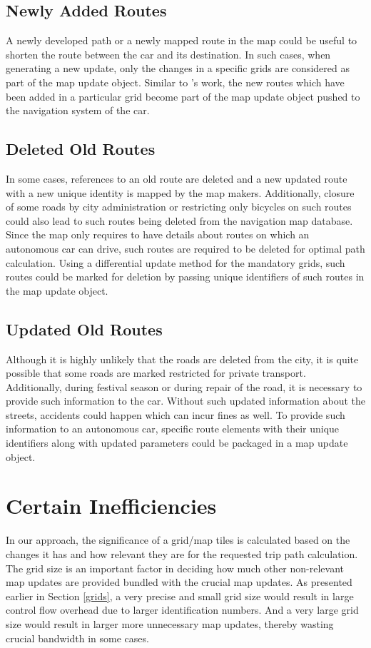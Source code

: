 \subsection{Newly Added Routes}
A newly developed path or a newly mapped route in the map could be useful to shorten the route between the car and its destination. In such cases, when generating a new update, only the changes in a specific grids are considered as part of the map update object. Similar to \citet{sakamoto2000proposal}'s work, the new routes which have been added in a particular grid become part of the map update object pushed to the navigation system of the car. 
\subsection{Deleted Old Routes}
In some cases, references to an old route are deleted and a new updated route with a new unique identity is mapped by the map makers. Additionally, closure of some roads by city administration or restricting only bicycles on such routes could also lead to such routes being deleted from the navigation map database. Since the map only requires to have details about routes on which an autonomous car can drive, such routes are required to be deleted for optimal path calculation. Using a differential update method for the mandatory grids, such routes could be marked for deletion by passing unique identifiers of such routes in the map update object. 
\subsection{Updated Old Routes}
Although it is highly unlikely that the roads are deleted from the city, it is quite possible that some roads are marked restricted for private transport. Additionally, during festival season or during repair of the road, it is necessary to provide such information to the car. Without such updated information about the streets, accidents could happen which can incur fines as well. To provide such information to an autonomous car, specific route elements with their unique identifiers along with updated parameters could be packaged in a map update object. 
\section{Certain Inefficiencies}
In our approach, the significance of a grid/map tiles is calculated based on the changes it has and how relevant they are for the requested trip path calculation. The grid size is an important factor in deciding how much other non-relevant map updates are provided bundled with the crucial map updates. As presented earlier in Section \ref{grids}, a very precise and small grid size would result in large control flow overhead due to larger identification numbers. And a very large grid size would result in larger more unnecessary map updates, thereby wasting crucial bandwidth in some cases. 
